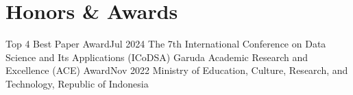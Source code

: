 \section{Honors \& Awards}
\resumeSubHeadingListStart
\resumeSubheading
{Top 4 Best Paper Award}{Jul 2024}
{The 7th International Conference on Data Science and Its Applications (ICoDSA)}{}
\resumeSubheading
{Garuda Academic Research and Excellence (ACE) Award}{Nov 2022}
{Ministry of Education, Culture, Research, and Technology, Republic of Indonesia}{}
\resumeSubHeadingListEnd